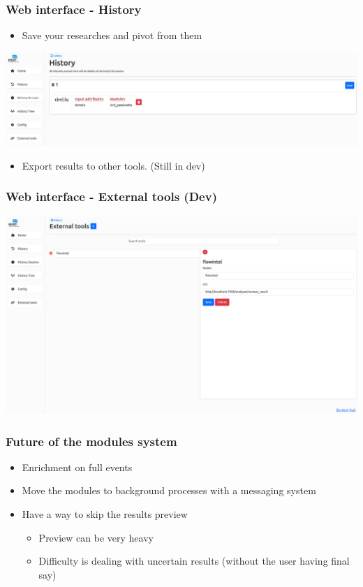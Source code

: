\begin{frame}[fragile]
    \frametitle{Web interface - History}
    \begin{itemize}
        \item Save your researches and pivot from them
    \end{itemize}
    \includegraphics[scale=0.23]{screenshots/misp_module_history.png}
\end{frame}

\begin{frame}[fragile]
    \begin{itemize}
        \item Export results to other tools. (Still in dev)
    \end{itemize}
    \frametitle{Web interface - External tools (Dev)}
    \includegraphics[scale=0.23]{screenshots/misp_module_external_tools.png}
\end{frame}

\begin{frame}[fragile]
    \frametitle{Future of the modules system}
    \begin{itemize}
        \item Enrichment on full events
        \item Move the modules to background processes with a messaging system
        \item Have a way to skip the results preview
        \begin{itemize}
            \item Preview can be very heavy
            \item Difficulty is dealing with uncertain results (without the user having final say)
        \end{itemize}
    \end{itemize}
\end{frame}

